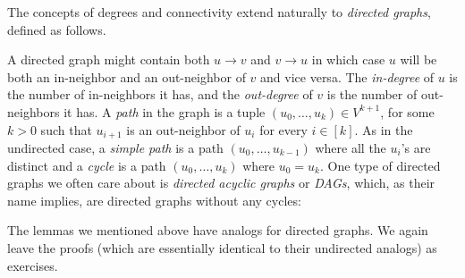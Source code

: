 The concepts of degrees and connectivity extend naturally to
\emph{directed graphs}, defined as follows.

\hypertarget{directedgraphdef}{}

A directed graph might contain both \(u \rightarrow v\) and
\(v \rightarrow u\) in which case \(u\) will be both an in-neighbor and
an out-neighbor of \(v\) and vice versa. The \emph{in-degree} of \(u\)
is the number of in-neighbors it has, and the \emph{out-degree} of \(v\)
is the number of out-neighbors it has. A \emph{path} in the graph is a
tuple \((u_0,\ldots,u_k) \in V^{k+1}\), for some \(k>0\) such that
\(u_{i+1}\) is an out-neighbor of \(u_i\) for every \(i\in [k]\). As in
the undirected case, a \emph{simple path} is a path
\((u_0,\ldots,u_{k-1})\) where all the \(u_i\)'s are distinct and a
\emph{cycle} is a path \((u_0,\ldots,u_k)\) where \(u_0=u_{k}\). One
type of directed graphs we often care about is \emph{directed acyclic
graphs} or \emph{DAGs}, which, as their name implies, are directed
graphs without any cycles:

\hypertarget{DAGdef}{}

The lemmas we mentioned above have analogs for directed graphs. We again
leave the proofs (which are essentially identical to their undirected
analogs) as exercises.

\hypertarget{diredgreesegeslem}{}


